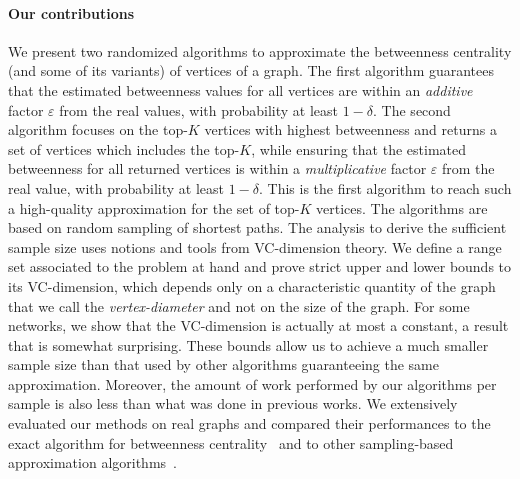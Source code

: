 \paragraph{Our contributions} 
We present two randomized algorithms to approximate the betweenness centrality
(and some of its variants) of vertices of a graph. The first algorithm
guarantees that the estimated betweenness values for all vertices are within an
\emph{additive} factor $\varepsilon$ from the real values, with probability at
least $1-\delta$. The second algorithm focuses on the top-$K$ vertices with
highest betweenness and returns a set of vertices which includes the top-$K$,
while ensuring that the estimated betweenness for all returned vertices is
within a \emph{multiplicative} factor $\varepsilon$ from the real value, with
probability at least $1-\delta$. This is the first algorithm to reach such a
high-quality approximation for the set of top-$K$ vertices. The algorithms are
based on random sampling of shortest paths. The analysis to derive the
sufficient sample size uses notions and tools from VC-dimension theory. We
define a range set associated to the problem at hand and prove strict upper and
lower bounds to its VC-dimension, which depends only on a characteristic
quantity of the graph that we call the \emph{vertex-diameter} and not on the
size of the graph. For some networks, we show that the VC-dimension is actually
at most a constant, a result that is somewhat surprising. These bounds allow us
to achieve a much smaller sample size than that used by other algorithms
guaranteeing the same approximation. Moreover, the amount of work performed by
our algorithms per sample is also less than what was done in previous works. We
extensively evaluated our methods on real graphs and compared their performances
to the exact algorithm for betweenness centrality~\citep{Brandes01} and to other
sampling-based approximation algorithms~\citep{JacobKLPT05,BrandesP07}.

